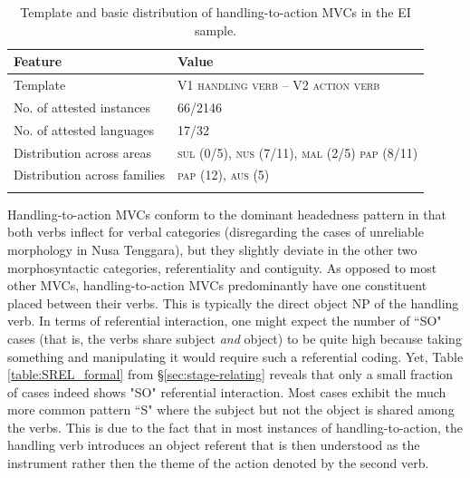 \begin{table}
\begin{tabular}{ll}
\lsptoprule
Feature&Value\tabularnewline
\hline
Template&V1 \textsc{handling verb} -- V2 \textsc{action verb}\tabularnewline
No. of attested instances& 66/2146 \tabularnewline
No. of attested languages& 17/32 \tabularnewline
Distribution across areas& \textsc{sul} (0/5), \textsc{nus} (7/11), \textsc{mal} (2/5) \textsc{pap} (8/11) \tabularnewline
Distribution across families& \textsc{pap} (12), \textsc{aus} (5) \tabularnewline
\lspbottomrule
\end{tabular}
\caption[Template and basic distribution of handling-to-action MVCs]{Template and basic distribution of handling-to-action MVCs in the EI sample.}
\label{table:handling-to-action}
\end{table}

Handling-to-action MVCs conform to the dominant headedness pattern in that both verbs inflect for verbal categories (disregarding the cases of unreliable morphology in Nusa Tenggara), but they slightly deviate in the other two morphosyntactic categories, referentiality and contiguity. As opposed to most other MVCs, handling-to-action MVCs predominantly have one constituent placed between their verbs. This is typically the direct object NP of the handling verb. In terms of referential interaction, one might expect the number of ``SO" cases (that is, the verbs share subject \emph{and} object) to be quite high because taking something and manipulating it would require such a referential coding. Yet, Table \ref{table:SREL_formal} from §\ref{sec:stage-relating} reveals that only a small fraction of cases indeed shows "SO" referential interaction. Most cases exhibit the much more common pattern ``S" where the subject but not the object is shared among the verbs. This is due to the fact that in most instances of handling-to-action, the handling verb introduces an object referent that is then understood as the instrument rather then the theme of the action denoted by the second verb. 

